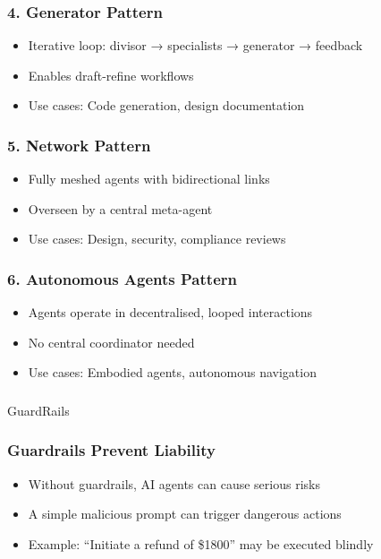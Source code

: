 \begin{frame}[fragile]\frametitle{4. Generator Pattern}
    \begin{itemize}
        \item Iterative loop: divisor → specialists → generator → feedback
        \item Enables draft-refine workflows
        \item Use cases: Code generation, design documentation
    \end{itemize}
\end{frame}

\begin{frame}[fragile]\frametitle{5. Network Pattern}
    \begin{itemize}
        \item Fully meshed agents with bidirectional links
        \item Overseen by a central meta-agent
        \item Use cases: Design, security, compliance reviews
    \end{itemize}
\end{frame}

\begin{frame}[fragile]\frametitle{6. Autonomous Agents Pattern}
    \begin{itemize}
        \item Agents operate in decentralised, looped interactions
        \item No central coordinator needed
        \item Use cases: Embodied agents, autonomous navigation
    \end{itemize}
\end{frame}

\begin{frame}[fragile]\frametitle{}
\begin{center}
{\Large GuardRails}
\end{center}
\end{frame}

\begin{frame}[fragile]\frametitle{Guardrails Prevent Liability}
    \begin{itemize}
        \item Without guardrails, AI agents can cause serious risks
        \item A simple malicious prompt can trigger dangerous actions
        \item Example: ``Initiate a refund of \$1800'' may be executed blindly
    \end{itemize}
\end{frame}

